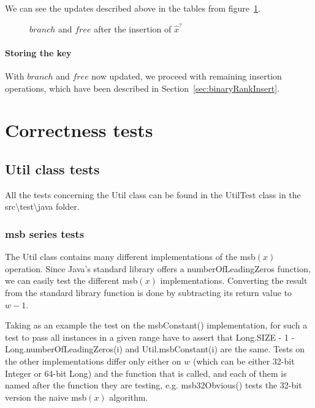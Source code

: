 \begin{enumerate}
    We can see the updates described above in the tables from figure~\ref{fig:branchAndFreeAfterUpdatingValuesForRank}.
    \begin{figure}[H]
    \centering
    
    \caption{$branch$ and $free$ after the insertion of $\hat x^?$}
    \label{fig:branchAndFreeAfterUpdatingValuesForRank}
    \end{figure}
    
\end{enumerate}

\subsubsection{Storing the key} \label{sec:dontCaresInsert}

With $branch$ and $free$ now updated, we proceed with remaining insertion operations, which have been described in Section~\ref{sec:binaryRankInsert}.

\chapter{Correctness tests}

\section{{\ttfamily Util} class tests}

All the tests concerning the {\ttfamily Util} class can be found in the {\ttfamily UtilTest} class in the {\ttfamily src\textbackslash test\textbackslash java} folder.

\subsection{msb series tests}

The {\ttfamily Util} class contains many different implementations of the msb$(x)$ operation. Since Java's standard library offers a {\ttfamily numberOfLeadingZeros} function, we can easily test the different msb$(x)$ implementations. Converting the result from the standard library function is done by subtracting its return value to $w - 1$.

Taking as an example the test on the {\ttfamily msbConstant()} implementation, for such a test to pass all instances in a given range have to assert that {\ttfamily Long.SIZE - 1 - Long.numberOfLeadingZeros(i)} and {\ttfamily Util.msbConstant(i)} are the same. Tests on the other implementations differ only either on $w$ (which can be either 32-bit {\ttfamily Integer} or 64-bit {\ttfamily Long}) and the function that is called, and each of them is named after the function they are testing, e.g. {\ttfamily msb32Obvious()} tests the 32-bit version the naive msb$(x)$ algorithm.

